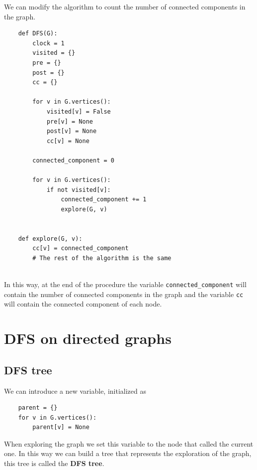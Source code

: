 \documentclass[12pt]{extarticle}
\begin{document}
We can modify the algorithm to count the number of connected components in the graph.

\begin{verbatim}
    def DFS(G):
        clock = 1
        visited = {}
        pre = {}
        post = {}
        cc = {}

        for v in G.vertices():
            visited[v] = False
            pre[v] = None
            post[v] = None
            cc[v] = None

        connected_component = 0

        for v in G.vertices():
            if not visited[v]:
                connected_component += 1
                explore(G, v)


    def explore(G, v):
        cc[v] = connected_component
        # The rest of the algorithm is the same


\end{verbatim}

In this way, at the end of the procedure the variable \texttt{connected\_component} will contain the number of connected components in the graph
and the variable \texttt{cc} will contain the connected component of each node.

\section{DFS on directed graphs}

\subsection{DFS tree}

We can introduce a new variable, initialized as

\begin{verbatim}
    parent = {}
    for v in G.vertices():
        parent[v] = None
\end{verbatim}

When exploring the graph we set this variable to the node that called the current one.
In this way we can build a tree that represents the exploration of the graph, this tree is called the \textbf{DFS tree}.
\end{document}
